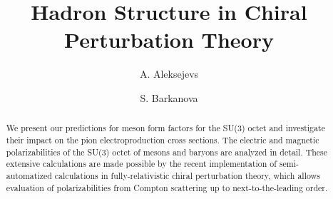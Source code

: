 \documentclass[3p,times,twocolumn]{revtex4}
\begin{document}
\large




\title{Hadron Structure in Chiral Perturbation Theory}


\author {A. Aleksejevs}

\author {S. Barkanova}

\begin{abstract}
We present our predictions for meson form factors for the SU(3)
octet and investigate their impact on the pion electroproduction cross
sections. The electric and magnetic polarizabilities of the SU(3) octet of mesons and
baryons are analyzed in detail. These extensive calculations are made possible
by the recent implementation of semi-automatized calculations in fully-relativistic
chiral perturbation theory, which allows evaluation of polarizabilities
from Compton scattering up to next-to-the-leading order. 
\end{abstract}

\maketitle
\end{document}
